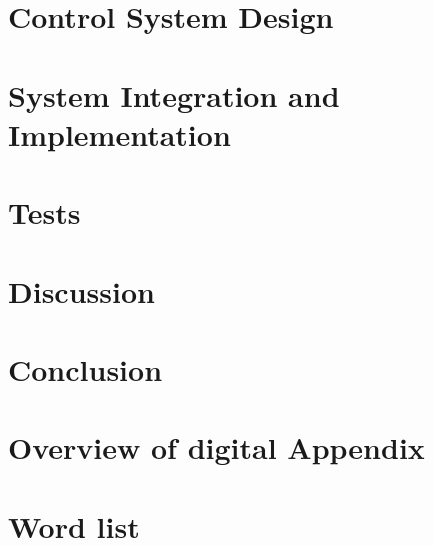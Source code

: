 \documentclass[a4paper, 10pt]{article}
\begin{document}
\section{Control System Design}\label{sec:System_Design}

\section{System Integration and Implementation}\label{sec:System_Integration_N_Implementation}



\section{Tests}\label{sec:Test}


\section{Discussion}\label{sec:Discussion}



\section{Conclusion}\label{sec:Conclusion}

\newpage



 
\newpage

\section{Overview of digital Appendix}\label{sec:digital_appendix}


\newpage
\section{Word list}\label{sec:wordlist}

\end{document}
